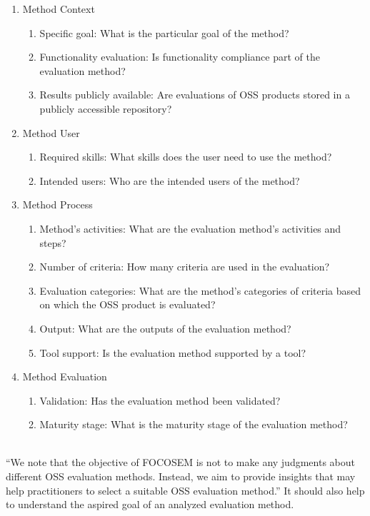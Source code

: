 \documentclass[DIV=calc,paper=a4,fontsize=9pt,twocolumn]{scrartcl}
\begin{document}
\begin{enumerate}
    \item Method Context
    \begin{enumerate}
        \item Specific goal: What is the particular goal of the method?
        \item Functionality evaluation: Is functionality compliance part of the evaluation method?
        \item Results publicly available: Are evaluations of OSS products stored in a publicly accessible repository?
    \end{enumerate}
    \item Method User
    \begin{enumerate}
        \item Required skills: What skills does the user need to use the method?
        \item Intended users: Who are the intended users of the method?
    \end{enumerate}
    \item Method Process
    \begin{enumerate}
        \item Method's activities: What are the evaluation method's activities and steps? 
        \item Number of criteria: How many criteria are used in the evaluation?
        \item Evaluation categories: What are the method's categories of criteria based on which the OSS product is evaluated?
        \item Output: What are the outputs of the evaluation method?
        \item Tool support: Is the evaluation method supported by a tool?
    \end{enumerate}
    \item Method Evaluation
    \begin{enumerate}
        \item Validation: Has the evaluation method been validated?
        \item Maturity stage: What is the maturity stage of the evaluation method?
    \end{enumerate}
\end{enumerate}

\citep{stol2010comparison}
\\

\enquote{We note that the objective of FOCOSEM is not to make any judgments about different OSS evaluation methods. Instead, we aim to provide insights that may help practitioners to select a suitable OSS evaluation method.} \citep{stol2010comparison} It should also help to understand the aspired goal of an analyzed evaluation method. 
\end{document}
